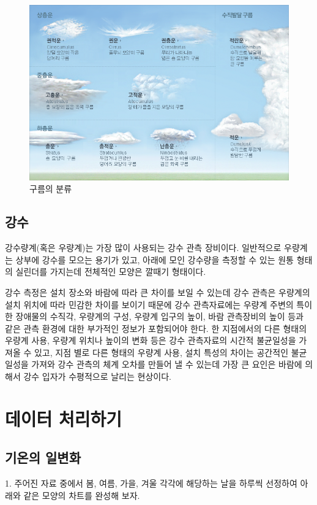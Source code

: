 \begin{figure}[]
	\centering
	\includegraphics[width=0.95\linewidth]{21observing/images/20}
	\caption{구름의 분류}
	\label{fig:20}
\end{figure}

\subsection{강수}

강수량계(혹은 우량계)는 가장 많이 사용되는 강수 관측 장비이다. 일반적으로 우량계는 상부에 강수를 모으는 용기가 있고, 아래에 모인 강수량을 측정할 수 있는 원통 형태의 실린더를 가지는데 전체적인 모양은 깔때기 형태이다.

강수 측정은 설치 장소와 바람에 따라 큰 차이를 보일 수 있는데 강수 관측은 우량계의 설치 위치에 따라 민감한 차이를 보이기 때문에 강수 관측자료에는 우량계 주변의 특이한 장애물의 수직각, 우량계의 구성, 우량계 입구의 높이, 바람 관측장비의 높이 등과 같은 관측 환경에 대한 부가적인 정보가 포함되어야 한다. 한 지점에서의 다른 형태의 우량계 사용, 우량계 위치나 높이의 변화 등은 강수 관측자료의 시간적 불균일성을 가져올 수 있고, 지점 별로 다른 형태의 우량계 사용, 설치 특성의 차이는 공간적인 불균일성을 가져와 강수 관측의 체계 오차를 만들어 낼 수 있는데 가장 큰 요인은 바람에 의해서 강수 입자가 수평적으로 날리는 현상이다.

\newpage

\section{데이터 처리하기}

\subsection{기온의 일변화}
1. 주어진 자료 중에서 봄, 여름, 가을, 겨울 각각에 해당하는 날을 하루씩 선정하여 아래와 같은 모양의 차트를 완성해 보자.

